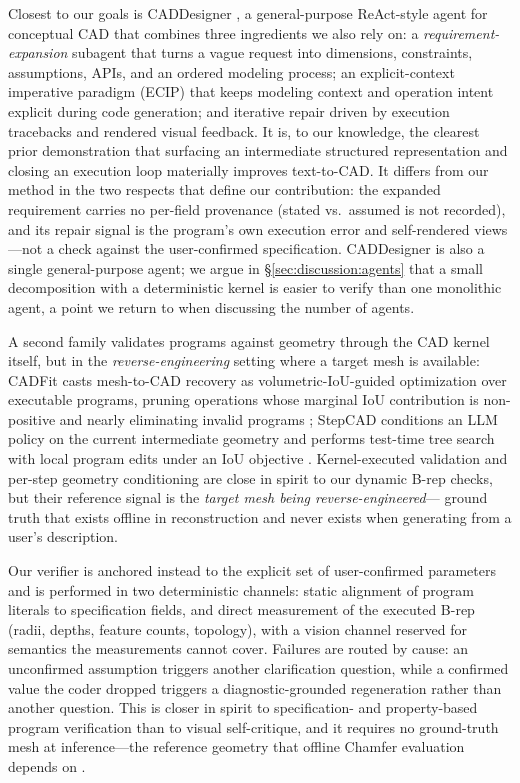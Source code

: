 Closest to our goals is CADDesigner \cite{caddesigner}, a general-purpose
ReAct-style agent for conceptual CAD that combines three ingredients we also
rely on: a \emph{requirement-expansion} subagent that turns a vague request
into dimensions, constraints, assumptions, APIs, and an ordered modeling
process; an explicit-context imperative paradigm (ECIP) that keeps modeling
context and operation intent explicit during code generation; and iterative
repair driven by execution tracebacks and rendered visual feedback. It is,
to our knowledge, the clearest prior demonstration that surfacing an
intermediate structured representation and closing an execution loop
materially improves text-to-CAD. It differs from our method in the two
respects that define our contribution: the expanded requirement carries no
per-field provenance (stated vs.\ assumed is not recorded), and its repair
signal is the program's own execution error and self-rendered views---not a
check against the user-confirmed specification. CADDesigner is also a single
general-purpose agent; we argue in \S\ref{sec:discussion:agents} that a small
decomposition with a deterministic kernel is easier to verify than one
monolithic agent, a point we return to when discussing the number of agents.

A second family validates programs against geometry through the CAD kernel
itself, but in the \emph{reverse-engineering} setting where a target mesh is
available: CADFit casts mesh-to-CAD recovery as volumetric-IoU-guided
optimization over executable programs, pruning operations whose marginal IoU
contribution is non-positive and nearly eliminating invalid programs
\cite{cadfit}; StepCAD conditions an LLM policy on the current intermediate
geometry and performs test-time tree search with local program edits under an
IoU objective \cite{stepcad}. Kernel-executed validation and per-step
geometry conditioning are close in spirit to our dynamic B-rep checks, but
their reference signal is the \emph{target mesh being reverse-engineered}---
ground truth that exists offline in reconstruction and never exists when
generating from a user's description.

Our verifier is anchored instead to the explicit set of user-confirmed
parameters and is performed in two deterministic channels: static alignment
of program literals to specification fields, and direct measurement of the
executed B-rep (radii, depths, feature counts, topology), with a vision
channel reserved for semantics the measurements cannot cover. Failures are
routed by cause: an unconfirmed assumption triggers another clarification
question, while a confirmed value the coder dropped triggers a
diagnostic-grounded regeneration rather than another question. This is closer
in spirit to specification- and property-based program verification
\cite{propertytesting} than to visual self-critique, and it requires no
ground-truth mesh at inference---the reference geometry that offline Chamfer
evaluation depends on \cite{chamfer_evals}.

